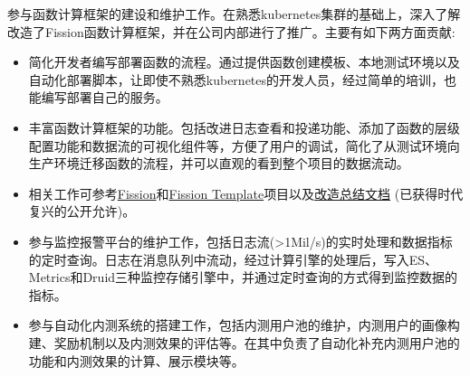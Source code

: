 \documentclass{resume}
\begin{document}
    参与函数计算框架的建设和维护工作。在熟悉kubernetes集群的基础上，深入了解改造了Fission函数计算框架，并在公司内部进行了推广。主要有如下两方面贡献:
  \begin{itemize}[topsep = 0 pt, partopsep = 0pt]
    \item 简化开发者编写部署函数的流程。通过提供函数创建模板、本地测试环境以及自动化部署脚本，让即使不熟悉kubernetes的开发人员，经过简单的培训，也能编写部署自己的服务。
    \item 丰富函数计算框架的功能。包括改进日志查看和投递功能、添加了函数的层级配置功能和数据流的可视化组件等，方便了用户的调试，简化了从测试环境向生产环境迁移函数的流程，并可以直观的看到整个项目的数据流动。
    \item 相关工作可参考\href{https://github.com/jingtaozhang18/fission}{Fission}和\href{https://github.com/jingtaozhang18/fission-template}{Fission Template}项目以及\href{https://jingtao.fun/%E6%BA%90%E7%A0%81-Fission%E5%8A%9F%E8%83%BD%E6%8B%93%E5%B1%95/}{改造总结文档} (已获得时代复兴的公开允许)。
  \end{itemize}
  
  \begin{itemize}[topsep = 0 pt, partopsep = 0pt]
    \item 参与监控报警平台的维护工作，包括日志流(>1Mil/s)的实时处理和数据指标的定时查询。日志在消息队列中流动，经过计算引擎的处理后，写入ES、Metrics和Druid三种监控存储引擎中，并通过定时查询的方式得到监控数据的指标。
    \item 参与自动化内测系统的搭建工作，包括内测用户池的维护，内测用户的画像构建、奖励机制以及内测效果的评估等。在其中负责了自动化补充内测用户池的功能和内测效果的计算、展示模块等。
  \end{itemize}
  
\end{document}
